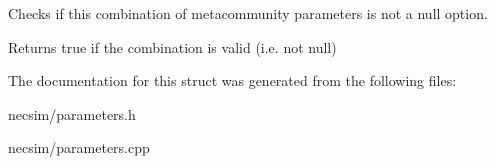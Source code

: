 Checks if this combination of metacommunity parameters is not a null option. 

\begin{DoxyReturn}{Returns}
true if the combination is valid (i.\+e. not null) 
\end{DoxyReturn}


The documentation for this struct was generated from the following files\+:\begin{DoxyCompactItemize}
\item 
necsim/parameters.\+h\item 
necsim/parameters.\+cpp\end{DoxyCompactItemize}
